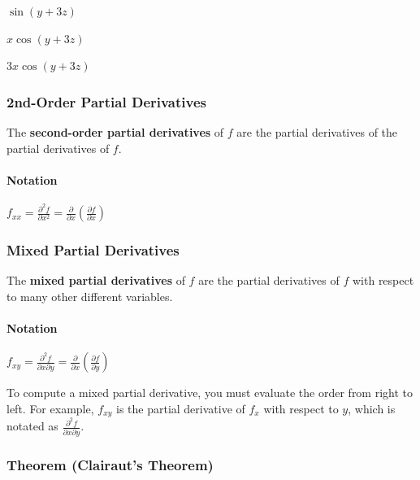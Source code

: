 \documentclass[
  letterpaper,
  DIV=11,
  numbers=noendperiod]{scrartcl}
\let\oldparagraph\paragraph
\renewcommand{\paragraph}[1]{\oldparagraph{#1}\mbox{}}
\begin{document}
$\displaystyle \sin{\left(y + 3 z \right)}$

$\displaystyle x \cos{\left(y + 3 z \right)}$

$\displaystyle 3 x \cos{\left(y + 3 z \right)}$

\hypertarget{nd-order-partial-derivatives}{%
\subsubsection{2nd-Order Partial
Derivatives}\label{nd-order-partial-derivatives}}

The \textbf{second-order partial derivatives} of \(f\) are the partial
derivatives of the partial derivatives of \(f\).

\hypertarget{notation-1}{%
\paragraph{Notation}\label{notation-1}}

\(f_{xx} = \frac{\partial^2 f}{\partial x^2} = \frac{\partial}{\partial x}\left(\frac{\partial f}{\partial x}\right)\)

\hypertarget{mixed-partial-derivatives}{%
\subsubsection{Mixed Partial
Derivatives}\label{mixed-partial-derivatives}}

The \textbf{mixed partial derivatives} of \(f\) are the partial
derivatives of \(f\) with respect to many other different variables.

\hypertarget{notation-2}{%
\paragraph{Notation}\label{notation-2}}

\(f_{xy} = \frac{\partial^2 f}{\partial x \partial y} = \frac{\partial}{\partial x}\left(\frac{\partial f}{\partial y}\right)\)

To compute a mixed partial derivative, you must evaluate the order from
right to left. For example, \(f_{xy}\) is the partial derivative of
\(f_x\) with respect to \(y\), which is notated as
\(\frac{\partial^2 f}{\partial x \partial y}\).

\hypertarget{theorem-clairauts-theorem}{%
\subsubsection{Theorem (Clairaut's
Theorem)}\label{theorem-clairauts-theorem}}
\end{document}
